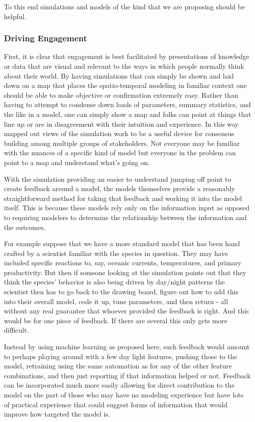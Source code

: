 \documentclass[11pt]{article}
\begin{document}
To this end simulations and models of the kind that we are proposing should be helpful. 

\subsubsection{Driving Engagement}

First, it is clear that engagement is best facilitated by presentations of knowledge or data that are visual and relevant to the ways in which people normally think about their world. By having simulations that can simply be shown and laid down on a map that places the spatio-temporal modeling in familiar context one should be able to make objective or confirmation extremely easy. Rather than having to attempt to condense down loads of parameters, summary statistics, and the like in a model, one can simply show a map and folks can point at things that line up or are in disagreement with their intuition and experience. In this way mapped out views of the simulation work to be a useful device for consensus building among multiple groups of stakeholders. Not everyone may be familiar with the nuances of a specific kind of model but everyone in the problem can point to a map and understand what's going on. 
\newline

With the simulation providing an easier to understand jumping off point to create feedback around a model, the models themselves provide a reasonably straightforward method for taking that feedback and working it into the model itself. This is because these models rely only on the information input as opposed to requiring modelers to determine the relationship between the information and the outcomes. 

For example suppose that we have a more standard model that has been hand crafted by a scientist familiar with the species in question. They may have included specific reactions to, say, oceanic currents, temperatures, and primary productivity. But then if someone looking at the simulation points out that they think the species' behavior is also being driven by day/night patterns the scientist then has to go back to the drawing board, figure out how to add this into their overall model, code it up, tune parameters, and then return - all without any real guarantee that whoever provided the feedback is right. And this would be for one piece of feedback. If there are several this only gets more difficult. 

Instead by using machine learning as proposed here, such feedback would amount to perhaps playing around with a few day light features, pushing those to the model, retraining using the same automation as for any of the other feature combinations, and then just reporting if that information helped or not. Feedback can be incorporated much more easily allowing for direct contribution to the model on the part of those who may have no modeling experience but have lots of practical experience that could suggest forms of information that would improve how targeted the model is.
\newline
\end{document}
